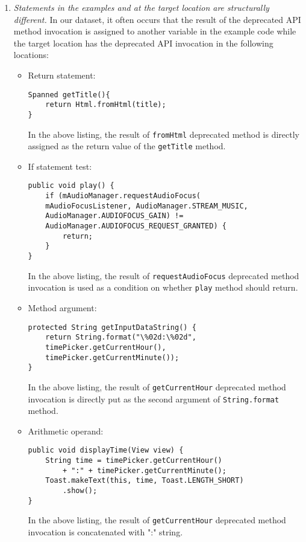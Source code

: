 \begin{enumerate}
\item {\em Statements in the examples and at the target location are structurally different.} In our dataset, it often occurs that the result of the deprecated API method invocation is assigned to another variable in the example code while the target location has the deprecated API invocation in the following locations:
\begin{itemize}
\item Return statement:
\begin{lstlisting}[language=text,numbers=none,caption=Invocation of a deprecated method in a return statement,captionpos=b, label=lst:invokeret]
Spanned getTitle(){
    return Html.fromHtml(title);
}
\end{lstlisting}
In the above listing, the result of {\tt fromHtml} deprecated method is directly assigned as the return value of the {\tt getTitle} method. 

\item If statement test:
\begin{lstlisting}[language=text,numbers=none,caption=Invocation of a deprecated method in an if statement,captionpos=b, label=lst:invokeif]
public void play() {
    if (mAudioManager.requestAudioFocus(
    mAudioFocusListener, AudioManager.STREAM_MUSIC,
    AudioManager.AUDIOFOCUS_GAIN) != 
    AudioManager.AUDIOFOCUS_REQUEST_GRANTED) {
        return;
    }
}
\end{lstlisting}
In the above listing, the result of {\tt requestAudioFocus} deprecated method invocation is used as a condition on whether {\tt play} method should return.
\item Method argument:
\begin{lstlisting}[language=text,numbers=none,caption=Invocation of a deprecated method in an method argument,captionpos=b, label=lst:invokemarg]
protected String getInputDataString() {
    return String.format("\%02d:\%02d", 
    timePicker.getCurrentHour(), 
    timePicker.getCurrentMinute());
}
\end{lstlisting}
In the above listing, the result of {\tt getCurrentHour} deprecated method invocation is directly put as the second argument of {\tt String.format} method.

\item Arithmetic operand:
\begin{lstlisting}[language=text,numbers=none,caption=Invocation of a deprecated method in an arithmetic operand,captionpos=b, label=lst:invokearit]
public void displayTime(View view) {
    String time = timePicker.getCurrentHour() 
	    + ":" + timePicker.getCurrentMinute();
    Toast.makeText(this, time, Toast.LENGTH_SHORT)
        .show();
}
\end{lstlisting}
In the above listing, the result of {\tt getCurrentHour} deprecated method invocation is concatenated with ":" string.
\end{itemize}


\end{enumerate}
